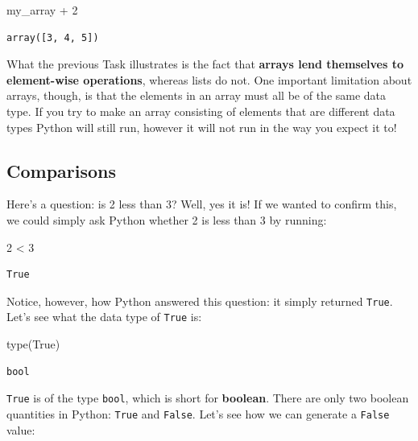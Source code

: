 \documentclass[
  11pt,
]{article}
\newenvironment{Shaded}{\begin{snugshade}}{\end{snugshade}}
\newcommand{\BuiltInTok}[1]{\textcolor[rgb]{0.00,0.23,0.31}{#1}}
\newcommand{\DecValTok}[1]{\textcolor[rgb]{0.68,0.00,0.00}{#1}}
\newcommand{\NormalTok}[1]{\textcolor[rgb]{0.00,0.23,0.31}{#1}}
\newcommand{\OperatorTok}[1]{\textcolor[rgb]{0.37,0.37,0.37}{#1}}
\newcommand{\VariableTok}[1]{\textcolor[rgb]{0.07,0.07,0.07}{#1}}
\begin{document}
\begin{Shaded}
\begin{Highlighting}[]
\NormalTok{my\_array }\OperatorTok{+} \DecValTok{2}
\end{Highlighting}
\end{Shaded}

\begin{verbatim}
array([3, 4, 5])
\end{verbatim}

What the previous Task illustrates is the fact that \textbf{arrays lend
themselves to element-wise operations}, whereas lists do not. One
important limitation about arrays, though, is that the elements in an
array must all be of the same data type. If you try to make an array
consisting of elements that are different data types Python will still
run, however it will not run in the way you expect it to!

\subsection{Comparisons}\label{comparisons}

Here's a question: is 2 less than 3? Well, yes it is! If we wanted to
confirm this, we could simply ask Python whether 2 is less than 3 by
running:

\begin{Shaded}
\begin{Highlighting}[]
\DecValTok{2} \OperatorTok{\textless{}} \DecValTok{3}
\end{Highlighting}
\end{Shaded}

\begin{verbatim}
True
\end{verbatim}

Notice, however, how Python answered this question: it simply returned
\texttt{True}. Let's see what the data type of \texttt{True} is:

\begin{Shaded}
\begin{Highlighting}[]
\BuiltInTok{type}\NormalTok{(}\VariableTok{True}\NormalTok{)}
\end{Highlighting}
\end{Shaded}

\begin{verbatim}
bool
\end{verbatim}

\texttt{True} is of the type \texttt{bool}, which is short for
\textbf{boolean}. There are only two boolean quantities in Python:
\texttt{True} and \texttt{False}. Let's see how we can generate a
\texttt{False} value:
\end{document}
